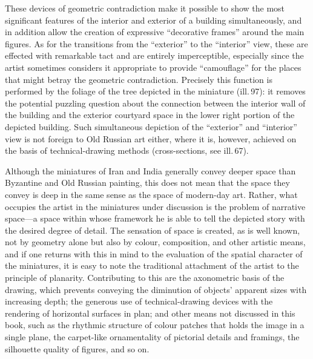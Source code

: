 These devices of geometric contradiction make it possible to show the most
significant features of the interior and exterior of a building simultaneously, and
in addition allow the creation of expressive ``decorative frames'' around the main
figures. As for the transitions from the ``exterior'' to the ``interior'' view,
these are effected with remarkable tact and are entirely imperceptible, especially
since the artist sometimes considers it appropriate to provide ``camouflage'' for
the places that might betray the geometric contradiction. Precisely this function is
performed by the foliage of the tree depicted in the miniature (ill.\,97): it
removes the potential puzzling question about the connection between the interior
wall of the building and the exterior courtyard space in the lower right portion of
the depicted building. Such simultaneous depiction of the ``exterior'' and
``interior'' view is not foreign to Old Russian art either, where it is, however,
achieved on the basis of technical-drawing methods (cross-sections, see ill.\,67).



Although the miniatures of Iran and India generally convey deeper space than
Byzantine and Old Russian painting, this does not mean that the space they convey
is deep in the same sense as the space of modern-day art. Rather, what occupies the
artist in the miniatures under discussion is the problem of narrative
space---a space within whose framework he is able to tell the depicted story with
the desired degree of detail. The sensation of space is created, as is well known,
not by geometry alone but also by colour, composition, and other artistic means,
and if one returns with this in mind to the evaluation of the spatial character of
the miniatures, it is easy to note the traditional attachment of the artist to the
principle of planarity. Contributing to this are the axonometric basis of the
drawing, which prevents conveying the diminution of objects' apparent sizes with
increasing depth; the generous use of technical-drawing devices with the rendering
of horizontal surfaces in plan; and other means not discussed in this book, such as
the rhythmic structure of colour patches that holds the image in a single plane, the
carpet-like ornamentality of pictorial details and framings, the silhouette quality
of figures, and so on.


